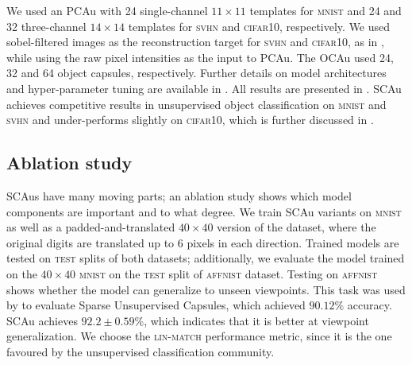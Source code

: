 We used an \gls{PCAu} with 24 single-channel $11\times11$ templates for \textsc{mnist} and 24 and 32 three-channel $14\times14$ templates for \textsc{svhn} and \textsc{cifar10}, respectively.
We used sobel-filtered images as the reconstruction target for \textsc{svhn} and \textsc{cifar10}, as in \cite{jaiswal}, while using the raw pixel intensities as the input to \gls{PCAu}.
The \gls{OCAu} used 24, 32 and 64 object capsules, respectively.
Further details on model architectures and hyper-parameter tuning are available in .
All results are presented in .
\gls{SCAu} achieves competitive results in unsupervised object classification on \textsc{mnist} and \textsc{svhn} and under-performs slightly on \textsc{cifar10}, which is further discussed in .

\subsection{Ablation study}
\label{sec:ablation}
\gls{SCAu}s have many moving parts;
an ablation study shows which model components are important and to what degree.
We train \gls{SCAu} variants on \textsc{mnist} as well as a padded-and-translated $40\times40$ version of the dataset, where the original digits are translated up to 6 pixels in each direction.
Trained models are tested on \textsc{test} splits of both datasets; additionally, we evaluate the model trained on the $40\times40$ \textsc{mnist} on the \textsc{test} split of \textsc{affnist} dataset.
Testing on \textsc{affnist} shows whether the model can generalize to unseen viewpoints.
This task was used by \cite{sparsecaps} to evaluate Sparse Unsupervised Capsules, which achieved $90.12\%$ accuracy. \Gls{SCAu} achieves $92.2\pm 0.59\%$, which indicates that it is better at viewpoint generalization.
We choose the \textsc{lin-match} performance metric, since it is the one favoured by the unsupervised classification community.
